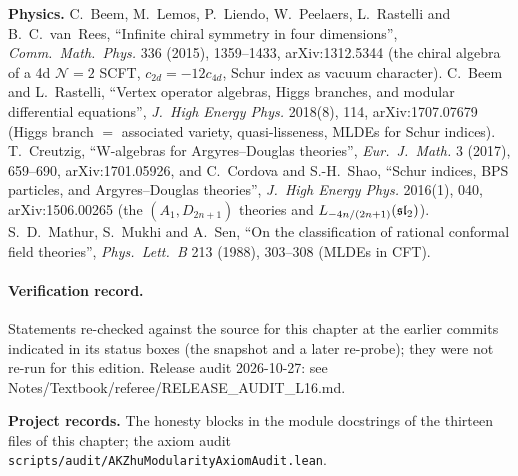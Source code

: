 \textbf{Physics.} C.~Beem, M.~Lemos, P.~Liendo, W.~Peelaers, L.~Rastelli and B.~C.~van~Rees, ``Infinite chiral symmetry in
four dimensions'', \emph{Comm.\ Math.\ Phys.} 336 (2015), 1359--1433, arXiv:1312.5344 (the chiral algebra of a 4d
$\mathcal N=2$ SCFT, $c_{2d} = -12c_{4d}$, Schur index as vacuum character). C.~Beem and L.~Rastelli, ``Vertex operator
algebras, Higgs branches, and modular differential equations'', \emph{J.\ High Energy Phys.} 2018(8), 114,
arXiv:1707.07679 (Higgs branch $=$ associated variety, quasi-lisseness, MLDEs for Schur indices). T.~Creutzig, ``W-algebras for
Argyres--Douglas theories'', \emph{Eur.\ J.\ Math.} 3 (2017), 659--690, arXiv:1701.05926, and C.~Cordova and S.-H.~Shao,
``Schur indices, BPS particles, and Argyres--Douglas theories'', \emph{J.\ High Energy Phys.} 2016(1), 040, arXiv:1506.00265
(the $(A_1,D_{2n+1})$ theories and $L_{-4n/(2n+1)}(\mathfrak{sl}_2)$). S.~D.~Mathur, S.~Mukhi and A.~Sen, ``On the classification of
rational conformal field theories'', \emph{Phys.\ Lett.\ B} 213 (1988), 303--308 (MLDEs in CFT).

\paragraph{Verification record.} Statements re-checked against the source for this chapter at the earlier commits indicated in its
status boxes (the snapshot and a later re-probe); they were not re-run for this edition.
Release audit 2026-10-27: see Notes/Textbook/referee/RELEASE\_AUDIT\_L16.md.

\textbf{Project records.} The honesty blocks in the module docstrings of the thirteen files of this chapter; the axiom audit
\texttt{scripts/\allowbreak audit/\allowbreak AKZhuModularityAxiomAudit.lean}.

\endgroup
